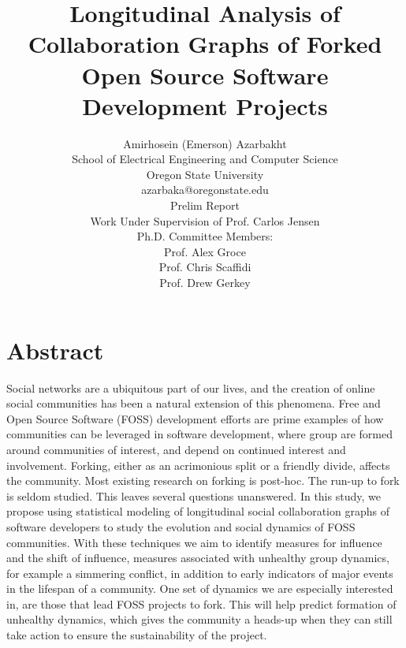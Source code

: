 \documentclass[11pt]{report}
\begin{document}
\title{Longitudinal Analysis of Collaboration Graphs of Forked Open Source Software Development Projects}

\author{Amirhosein (Emerson) Azarbakht\\
School of Electrical Engineering and Computer Science\\
Oregon State University\\
\vspace{5mm} %
azarbaka@oregonstate.edu\\
\vspace{5mm} %
Prelim Report\\
Work Under Supervision of Prof. Carlos Jensen\\
Ph.D. Committee Members:\\
Prof. Alex Groce\\
Prof. Chris Scaffidi\\
Prof. Drew Gerkey\\
}

\maketitle

\section{Abstract}
Social networks are a ubiquitous part of our lives, and the creation of online social communities has been a natural extension of this phenomena. Free and Open Source Software (FOSS) development efforts are prime examples of how communities can be leveraged in software development, where group are formed around communities of interest, and depend on continued interest and involvement. Forking, either as an acrimonious split or a friendly divide, affects the community. Most existing research on forking is post-hoc. The run-up to fork is seldom studied. This leaves several questions unanswered. In this study, we propose using statistical modeling of longitudinal social collaboration graphs of software developers to study the evolution and social dynamics of FOSS communities. With these techniques we aim to identify measures for influence and the shift of influence, measures associated with unhealthy group dynamics, for example a simmering conflict, in addition to early indicators of major events in the lifespan of a community. One set of dynamics we are especially interested in, are those that lead FOSS projects to fork. This will help predict formation of unhealthy dynamics, which gives the community a heads-up when they can still take action to ensure the sustainability of the project.
\end{document}

